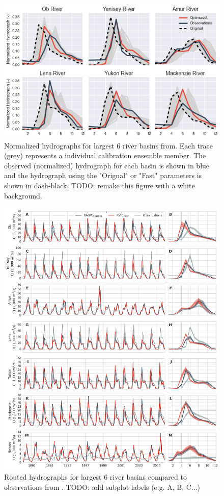 \documentclass[jgrga, draft]{agutex}
\begin{document}
\clearpage
\begin{figure}
\noindent\includegraphics[width=40pc,natwidth=1]{calibration_hydrographs}
\caption{Normalized hydrographs for largest 6 river basins from.  Each trace (grey) represents a individual calibration ensemble member. The observed (normalized) hydrograph for each basin is shown in blue and the hydrograph using the "Orignal" or "Fast" parameters is shown in dash-black. TODO: remake this figure with a white background.}
\label{fig:calibration_hydrographs}
\end{figure}

\clearpage
\begin{figure}
\noindent\includegraphics[width=40pc,natwidth=1]{R1010RBRbaaa01a_rvicfast_hydrographs}
\caption{Routed hydrographs for largest 6 river basins compared to observations from \citet{Dai_2009}. TODO: add subplot labels (e.g. A, B, C...)}
\label{fig:hydrographs}
\end{figure}
\end{document}
